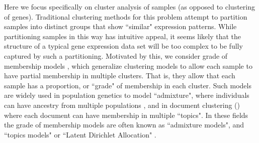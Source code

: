 Here we focus specifically on cluster analysis of samples (as opposed to clustering of genes). 
Traditional clustering methods for this problem attempt to partition samples into distinct groups that show ``similar" expression patterns. 
While partitioning samples in this way has intuitive appeal, 
it seems likely that the structure of a typical gene expression data set will be too complex to be fully captured by such a partitioning. 
Motivated by this, we consider grade of membership models \cite{Erosheva2006}, which generalize clustering models 
to allow each sample to have partial membership in multiple clusters.
That is, they allow that each sample has a proportion, or ``grade" of membership in each cluster. Such
models are widely used in population genetics to model ``admixture", where individuals can have ancestry from multiple populations \cite{Pritchard2000},
and in document clustering (\cite{Blei2003,Blei2009}) where each document can have membership in multiple ``topics". In these fields
the grade of membership models are often known as ``admixture models", and ``topics models" or ``Latent Dirichlet Allocation" \cite{Blei2003}.





